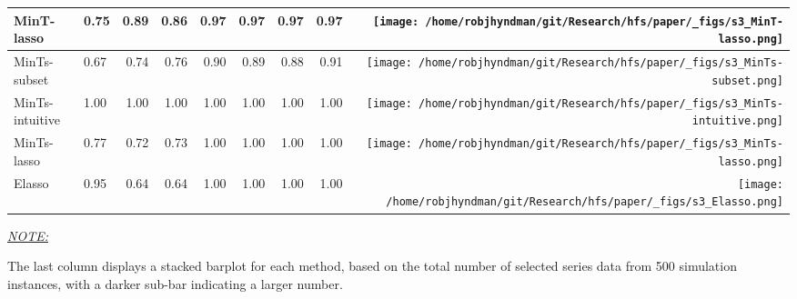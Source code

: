 \documentclass[
  12pt,
  11pt]{article}
\begin{document}
\begin{table}[!h]
\begin{threeparttable}
\begin{tabular}{llrrrrrr>{}r}
MinT-lasso & 0.75 & 0.89 & 0.86 & 0.97 & 0.97 & 0.97 & 0.97 & \texttt{[image: /home/robjhyndman/git/Research/hfs/paper/\_figs/s3\_MinT-lasso.png]}\\
\midrule
MinTs-subset & 0.67 & 0.74 & 0.76 & 0.90 & 0.89 & 0.88 & 0.91 & \texttt{[image: /home/robjhyndman/git/Research/hfs/paper/\_figs/s3\_MinTs-subset.png]}\\
MinTs-intuitive & 1.00 & 1.00 & 1.00 & 1.00 & 1.00 & 1.00 & 1.00 & \texttt{[image: /home/robjhyndman/git/Research/hfs/paper/\_figs/s3\_MinTs-intuitive.png]}\\
MinTs-lasso & 0.77 & 0.72 & 0.73 & 1.00 & 1.00 & 1.00 & 1.00 & \texttt{[image: /home/robjhyndman/git/Research/hfs/paper/\_figs/s3\_MinTs-lasso.png]}\\
\midrule
Elasso & 0.95 & 0.64 & 0.64 & 1.00 & 1.00 & 1.00 & 1.00 & \texttt{[image: /home/robjhyndman/git/Research/hfs/paper/\_figs/s3\_Elasso.png]}\\
\bottomrule
\end{tabular}
\begin{tablenotes}[para]
\item \underline{\textit{NOTE:}} 
\item The last column displays a stacked barplot for each method, based on the total number of selected series data from 500 simulation instances, with a darker sub-bar indicating a larger number.
\end{tablenotes}
\end{threeparttable}
\endgroup{}
\end{table}
\end{document}
